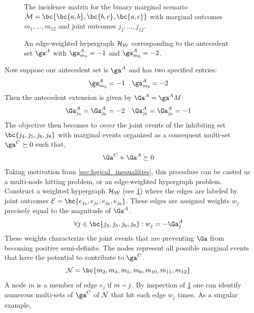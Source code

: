 \documentclass[aps, 10pt, english, twoside, pra, nofootinbib, longbibliography]{revtex4-1}
\begin{document}
\begin{example}
\begin{figure}
\begin{center}
\begin{minipage}[b]{.48\textwidth}
\[{                } \]
                \caption{The incidence matrix for the binary marginal scenario $\mscenario = \bc{\bc{a,b},\bc{b,c}, \bc{a,c}}$ with marginal outcomes $m_1, \ldots, m_{12}$ and joint outcomes $j_1, \ldots, j_{12}$.}
                \label{fig:compact_incidence}
            \end{minipage}\hspace{0.04\textwidth}%
            \begin{minipage}[b]{.48\textwidth}
                \centering
                \scalebox{1.0}{}
                \caption{An edge-weighted hypergraph $\mathcal{H}_{\mathcal{W}}$ corresponding to the antecedent set $\ga^{A}$ with $\ga^{A}_{m_3} = -1$ and $\ga^{A}_{m_8} = -2$.}
                \label{fig:hypergraph_example}
            \end{minipage}
        \end{center}
        \end{figure}
        Now suppose our antecedent set is $\ga^{A}$ and has two specified entries:
        \[ \ga^{A}_{m_{3}} = -1 \quad \ga^{A}_{m_{8}} = -2 \]
        Then the antecedent extension is given by $\Ga^{A}= \ga^{A} \tcdot M$:
        \[ \Ga^{A}_{j_{4}} = \Ga^{A}_{j_{8}} = -2 \quad \Ga^{A}_{j_{5}} = \Ga^{A}_{j_{6}} = -1 \]
        The objective then becomes to \textit{cover} the joint events of the inhibiting set $\bc{j_{4}, j_{5}, j_{6}, j_{8}}$ with marginal events organized as a consequent multi-set $\ga^{C} \succeq 0$ such that,
        \[ \Ga^{C} + \Ga^{A} \succeq 0 \]
        Taking motivation from \cref{sec:logical_inequalities}, this procedure can be casted as a multi-node hitting problem, or an edge-weighted hypergraph problem. Construct a weighted hypergraph $\mathcal{H}_{\mathcal{W}}$ (see \cref{fig:hypergraph_example}) where the edges are labeled by joint outcomes $\edges = \bc{e_{j_{4}}, e_{j_{5}}, e_{j_{6}}, e_{j_{8}}}$. These edges are assigned weights $w_j$ precisely equal to the magnitude of $\Ga^{A}$.
        \[ \forall j \in \bc{{j_{4}}, {j_{5}}, {j_{6}}, {j_{8}}} : w_{j} = - \Ga^{A}_j \]
        These weights characterize the joint events that are preventing $\Ga$ from becoming positive semi-definite. The nodes represent all possible marginal events that have the potential to contribute to $\ga^{C}$.
        \[ \nodes = \bc{m_2, m_4, m_5, m_6, m_{10}, m_{11}, m_{12}} \]
        A node $m$ is a member of edge $e_{j}$ if $m \mathrel{\Yleft} j$. By inspection of \cref{fig:hypergraph_example} one can identify numerous multi-sets of $\ga^{C}$ of $\mathcal{N}$ that hit each edge $w_j$ times. As a singular example,

\end{example}
\end{document}
